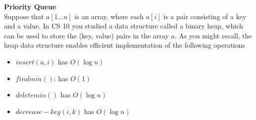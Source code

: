 \textbf{Priority Queue} \\
Suppose that $a[1 \ldots n]$ is an array, where each $a[i]$ is a pair consisting of a key and a value. In CS 10
you studied a data structure called a binary heap, which can be used to store the (key, value) pairs
in the array $a$. As you might recall, the heap data structure enables efficient implementation of the
following operations

\begin{customsolutionbox}
    \begin{itemize}
        \item $insert(a, i)$ has $O(\log n)$
        \item $findmin()$: has $O(1)$
        \item $deletemin()$ has $O(\log n)$
        \item $decrease-key(i, k)$ has $O(\log n)$
    \end{itemize}
\end{customsolutionbox}